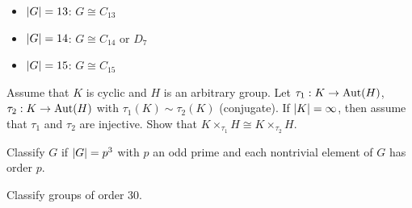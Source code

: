 \begin{itemize}
\begin{proof}
\begin{itemize}
          And since $n_3 = 4$, there are $8$ elements of order $3$ which corresponds 
          to $8$ $3$-sycles in $A_4$, thus $\abs{\Image \phi \cap A_4} \ge 8$.
          But $\abs{\Image \phi \cap A_4} \Div \abs{A_4} = 12 \implies \Image \phi = A_4$
      \end{itemize}
    \end{proof}
    Now, for the case where $\exists H \in \Syl_3(G)$ and $H \lhd G$.
    Let $K \in \Syl_2(G)$, then $K \cap H = \{1\}$ and $KH = G \implies G \cong K \times_\tau H$
    for some $\tau: K \to \Aut(H) = \{\text{id}, \phi_2\}$
    \begin{itemize}
      \item $\tau$ is trivial: $\Zb_{12}$ or $\Zb_2 \times \Zb_6$.
      \item $\gen{b} = K \cong \Zb_4$: $\tau(b) = \phi_2 \implies G = \gen{a,b \mid a^3=1, b^4=1, bab^{-1} = a^{-1}} \not\cong D_6,A_4$
      \item $\gen{b} = K \cong \Zb_2 \times \Zb_2$: Let $K = \gen{b,c\mid b^2=1, c^2=1, bc=cb}$,
        then $\tau: b \mapsto \phi_2$ and $c \mapsto \text{id}$ (the other cases are equivalent to this one),
        $G = \gen{a,b,c \mid a^3 = 1, b^2 = 1, c^2 = 1, bc=cb,bab^{-1} = a^{-1}, cac^{-1} = a} \cong \gen{a,b\mid a^3=1,b^2=1, bab^{-1} = a^{-1}} \times \gen{c} \cong D_3 \times C_2 \cong D_6$
        \begin{fact}
          For odd $n$, $D_{2n} \cong D_n \times \quot{\Zb}{2\Zb}$.
          \begin{proof}
            \[D_{2n} = \gen{a,b\mid a^{2n}=1,b^2=1, bab^{-1} = a^{-1}}\]
            \[H = \gen{a^2,b\mid (a^2)^{n}=1,b^2=1, b(a^2)b^{-1} = a^{-2}} \cong D_n\]
            \[K = \gen{a^n} \cong C_2\]
            And $n$ is odd, so $H \cap K = \{1\}$ and $D_{2n} \cong D_n \times C_2$
          \end{proof}
        \end{fact}
    \end{itemize}
  \item $\lvert G\rvert = 13$: $G \cong C_{13}$
  \item $\lvert G\rvert = 14$: $G \cong C_{14} \text{~or~} D_7$
  \item $\lvert G\rvert = 15$: $G \cong C_{15}$
\end{itemize}

\begin{exercise} \mbox{}
  Assume that $K$ is cyclic and $H$ is an arbitrary group.
  Let $\tau_1: K \to \operatorname{Aut}(H)$, $\tau_2: K \to \operatorname{Aut}(H)$ with $\tau_1(K) \sim \tau_2(K)$ (conjugate).
  If $\lvert K\rvert = \infty$, then assume that $\tau_1$ and $\tau_2$ are injective. Show that $K \times_{\tau_1} H \cong K \times_{\tau_2} H$.
\end{exercise}

\begin{exercise}
  Classify $G$ if $\lvert G\rvert = p^3$ with $p$ an odd prime and each nontrivial element of $G$ has order $p$.
\end{exercise}

\begin{exercise}
  Classify groups of order $30$.
\end{exercise}

